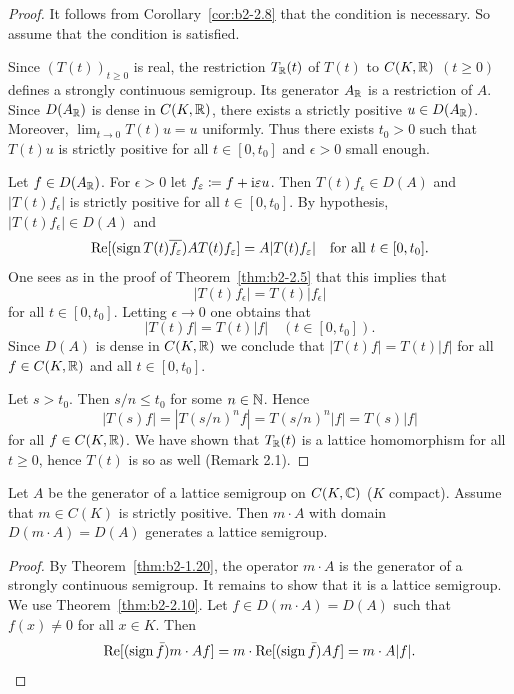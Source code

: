\begin{proof}%
It follows from  Corollary~\ref{cor:b2-2.8} that the condition is necessary.
So assume that the condition is satisfied.

Since $(T(t))_{t \geq 0}$ is real, the restriction $T_{\mathbb{R}}(t)$ of\/ $T(t)$ to $C(K,\mathbb{R})$ $(t \geq 0)$ defines a strongly continuous semigroup.
Its generator $A_{\mathbb{R}}$ is a restriction of\/ $A$.
Since $D(A_{\mathbb{R}})$ is dense in $C(K,\mathbb{R})$, there exists a strictly positive $u \in D(A_{\mathbb{R}})$.
Moreover, $\lim_{t \to 0} T(t)u = u$ uniformly.
Thus there exists $t_{0} > 0$ such that $T(t)u$ is strictly positive for all $t \in [0,t_{0}]$ and $ \epsilon > 0 $ small enough.
 
Let $f \in D(A_{\mathbb{R}})$.
For $\epsilon > 0$ let $f_{\epsilon} \coloneq f + \iu \epsilon u$.
Then $T(t)f_{\epsilon} \in D(A)$ and $|T(t)f_{\epsilon}|$ is strictly positive for all $t \in [0,t_{0}]$.
By hypothesis, $|T(t)f_{\epsilon}| \in D(A)$ and 
\[
\Re[(\sign T(t)\overline{f_{\epsilon}})AT(t)f_{\epsilon}] = A|T(t)f_{\epsilon}|
\quad \text{for all $t \in [0,t_{0}]$}.
\]
One sees as in the proof of Theorem~\ref{thm:b2-2.5} that this implies that 
%
\[
	|T(t)f_{\epsilon}| = T(t)|f_{\epsilon}| 
\]
%
for all $t \in [0,t_{0}]$.
Letting $\epsilon \to 0$ one obtains that 
%
\[
	 |T(t)f| = T(t)|f| \quad (t \in [0,t_{0}]) .
\]
%
Since $D(A)$ is dense in $C(K,\mathbb{R})$ we conclude that $|T(t)f| = T(t)|f|$ for all $f \in C(K,\mathbb{R})$ and all $t \in [0,t_{0}]$.

Let $s > t_{0}$.
Then $s/n \leq t_{0}$ for some $n \in \mathbb{N}$.
Hence 
%
\[
	|T(s)f| = |T(s/n)^{n}f| = T(s/n)^{n}|f| = T(s)|f|
\]
%
for all $f \in C(K,\mathbb{R})$.
We have shown that $T_{\mathbb{R}}(t)$ is a lattice homomorphism for all $t \geq 0$,  hence $T(t)$ is so as well (\cf Remark 2.1).
\end{proof}
\begin{corollary}\label{cor:b2-2.11}
Let $A$ be the generator of a lattice semigroup on $C(K,\mathbb{C})$ ($K$ compact).
Assume that  $m \in C(K)$ is strictly positive.
Then  $m \cdot A$ with domain $D(m \cdot A) = D(A)$ generates a lattice semigroup.
\end{corollary}
\begin{proof}
By Theorem~\ref{thm:b2-1.20}, the operator  $m \cdot A$ is the generator of a strongly continuous semigroup.
It remains to show that it is a lattice semigroup.
We use Theorem~\ref{thm:b2-2.10}.
Let $f \in D(m \cdot A) = D(A)$ such that $f(x) \neq 0$ for all $x \in K$.
Then 
\begin{equation*}
\mathop{}\!\mathrm{Re}[(\operatorname{sign} \bar{f})m \cdot Af] = m \cdot \mathop{}\!\mathrm{Re}[(\operatorname{sign} \bar{f})Af] = m \cdot A|f|.
\qedhere
\end{equation*}
\end{proof}
